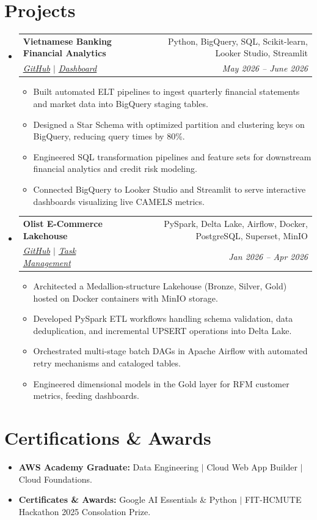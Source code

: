 \documentclass[10pt,a4paper]{article}
\makeatletter
\newcommand{\resumeItem}[1]{
  \item\small{
    {#1 \vspace{-2pt}}
  }
}
\newcommand{\resumeSubheading}[4]{
  \vspace{-1pt}\item
    \begin{tabular*}{0.97\textwidth}[t]{l@{\extracolsep{\fill}}r}
      \textbf{#1} & \small#2 \\
      \textit{\small#3} & \textit{\small #4} \\
    \end{tabular*}\vspace{-5pt}
}
\newcommand{\resumeSubHeadingListStart}{\begin{itemize}[leftmargin=0.15in, label={}]}
\newcommand{\resumeSubHeadingListEnd}{\end{itemize}}
\newcommand{\resumeItemListStart}{\begin{itemize}}
\newcommand{\resumeItemListEnd}{\end{itemize}\vspace{-5pt}}
\makeatother
\begin{document}
\section{Projects}
  \resumeSubHeadingListStart
    \resumeSubheading
      {Vietnamese Banking Financial Analytics}{Python, BigQuery, SQL, Scikit-learn, Looker Studio, Streamlit}
      {\href{https://github.com/darktheDE/vn-banking-dwh-analytics}{\underline{GitHub}} $|$ \href{https://datastudio.google.com/u/0/reporting/340892d5-4366-4e40-9403-47901040b1d7/page/v1e2F}{\underline{Dashboard}}}{May 2026 -- June 2026}
      \resumeItemListStart
        \resumeItem{Built automated ELT pipelines to ingest quarterly financial statements and market data into BigQuery staging tables.}
        \resumeItem{Designed a Star Schema with optimized partition and clustering keys on BigQuery, reducing query times by 80\%.}
        \resumeItem{Engineered SQL transformation pipelines and feature sets for downstream financial analytics and credit risk modeling.}
        \resumeItem{Connected BigQuery to Looker Studio and Streamlit to serve interactive dashboards visualizing live CAMELS metrics.}
      \resumeItemListEnd

    \resumeSubheading
      {Olist E-Commerce Lakehouse}{PySpark, Delta Lake, Airflow, Docker, PostgreSQL, Superset, MinIO}
      {\href{https://github.com/darktheDE/Olist-E-Commerce-Lakehouse}{\underline{GitHub}} $|$ \href{https://sites.plane.so/issues/fb4056e1975041fb96f169aff25798e6}{\underline{Task Management}}}{Jan 2026 -- Apr 2026}
      \resumeItemListStart
        \resumeItem{Architected a Medallion-structure Lakehouse (Bronze, Silver, Gold) hosted on Docker containers with MinIO storage.}
        \resumeItem{Developed PySpark ETL workflows handling schema validation, data deduplication, and incremental UPSERT operations into Delta Lake.}
        \resumeItem{Orchestrated multi-stage batch DAGs in Apache Airflow with automated retry mechanisms and cataloged tables.}
        \resumeItem{Engineered dimensional models in the Gold layer for RFM customer metrics, feeding dashboards.}
      \resumeItemListEnd
  \resumeSubHeadingListEnd

\section{Certifications \& Awards}
 \begin{itemize}[leftmargin=0.15in, itemsep=-2pt]
    \item \small \textbf{AWS Academy Graduate:} Data Engineering $|$ Cloud Web App Builder $|$ Cloud Foundations.
    \item \small \textbf{Certificates \& Awards:} Google AI Essentials \& Python $|$ FIT-HCMUTE Hackathon 2025 Consolation Prize.
 \end{itemize}
\end{document}
